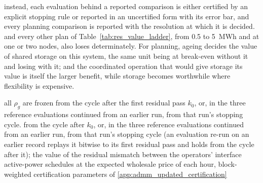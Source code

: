     instead, each evaluation behind a reported comparison is either certified by an explicit stopping rule or reported in an uncertified form with its error bar, and every planning comparison is reported with the resolution at which it is decided.
    and every other plan of Table~\ref{tab:res_value_ladder}, from 0.5 to 5~MWh and at one or two nodes, also loses determinately.
    For planning, ageing decides the value of shared storage on this system, the same unit being at break-even without it and losing with it; and the coordinated operation that would give storage its value is itself the larger benefit, while storage becomes worthwhile where flexibility is expensive.

    all $\rho_g$ are frozen from the cycle after the first residual pass $k_0$, or, in the three reference evaluations continued from an earlier run, from that run's stopping cycle.
    from the cycle after $k_0$, or, in the three reference evaluations continued from an earlier run, from that run's stopping cycle (an evaluation re-run on an earlier record replays it bitwise to its first residual pass and holds from the cycle after it);
    the value of the residual mismatch between the operators' interface active-power schedules at the expected wholesale price of each hour, block-weighted
    certification parameters of \ref{app:admm_updated_certification}

